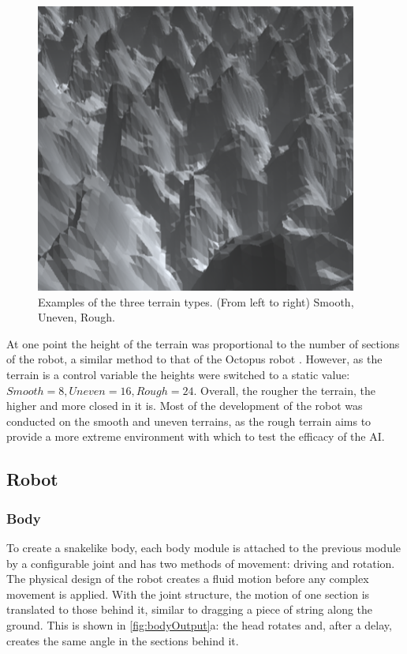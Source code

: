 \documentclass{article}
\begin{document}
\begin{figure}[H]
\includegraphics[scale=0.3]{roughTerrain}
\caption{Examples of the three terrain types. (From left to right) Smooth, Uneven, Rough.}
\end{figure}

At one point the height of the terrain was proportional to the number of sections of the robot, a similar method to that of the Octopus robot . However, as the terrain is a control variable the heights were switched to a static value: $Smooth=8, Uneven=16, Rough=24$. Overall, the rougher the terrain, the higher and more closed in it is. Most of the development of the robot was conducted on the smooth and uneven terrains, as the rough terrain aims to provide a more extreme environment with which to test the efficacy of the AI.\\


\subsection{Robot}
\label{sec:Robot Imp}
\subsubsection{Body}
\label{sec:Body Imp}
To create a snakelike body, each body module is attached to the previous module by a configurable joint  and has two methods of movement: driving and rotation. The physical design of the robot creates a fluid motion before any complex movement is applied. With the joint structure, the motion of one section is translated to those behind it, similar to dragging a piece of string along the ground. This is shown in \autoref{fig:bodyOutput}a: the head rotates and, after a delay, creates the same angle in the sections behind it.\\
\end{document}
